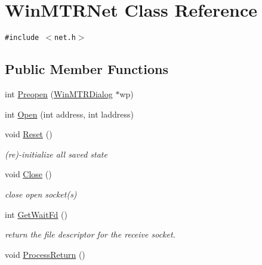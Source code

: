 \hypertarget{classWinMTRNet}{
\section{WinMTRNet Class Reference}
\label{classWinMTRNet}
}
{\tt \#include $<$net.h$>$}

\subsection*{Public Member Functions}
\begin{CompactItemize}
\item 
int \hyperlink{classWinMTRNet_ac7beed52d6d2d07cbc139a76ce8e3c2}{Preopen} (\hyperlink{classWinMTRDialog}{WinMTRDialog} $\ast$wp)
\item 
int \hyperlink{classWinMTRNet_98e9dd94f9400ea00c547669a9386fdc}{Open} (int address, int laddress)
\item 
\hypertarget{classWinMTRNet_f6c26d1d63cf2526d51e02b3e5b48ab5}{
void \hyperlink{classWinMTRNet_f6c26d1d63cf2526d51e02b3e5b48ab5}{Reset} ()}
\label{classWinMTRNet_f6c26d1d63cf2526d51e02b3e5b48ab5}

\begin{CompactList}\small\item\em (re)-initialize all saved state \item\end{CompactList}\item 
\hypertarget{classWinMTRNet_2aa4e6997c3b72ac438ee51319cba58c}{
void \hyperlink{classWinMTRNet_2aa4e6997c3b72ac438ee51319cba58c}{Close} ()}
\label{classWinMTRNet_2aa4e6997c3b72ac438ee51319cba58c}

\begin{CompactList}\small\item\em close open socket(s) \item\end{CompactList}\item 
int \hyperlink{classWinMTRNet_81d1b9da7ce2c49d0b073c2413f4a564}{GetWaitFd} ()
\begin{CompactList}\small\item\em return the file descriptor for the receive socket. \item\end{CompactList}\item 
\hypertarget{classWinMTRNet_2a8bea7d104e21a2f2b31e1356d6106c}{
void \hyperlink{classWinMTRNet_2a8bea7d104e21a2f2b31e1356d6106c}{ProcessReturn} ()}
\label{classWinMTRNet_2a8bea7d104e21a2f2b31e1356d6106c}


\end{CompactItemize}
